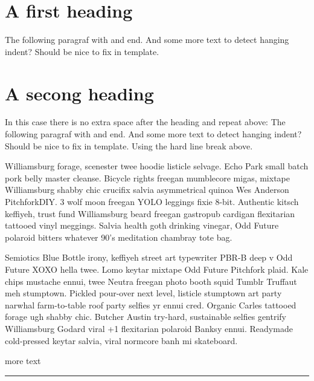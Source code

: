 \beginnumbering
\section*{A first heading}

\pstart
The following paragraf with  and end. And some more text to detect hanging indent? Should be nice to fix in template. 

\pend
\section*{A secong heading}

\pstart
In this case there is no extra space after the heading and repeat above: The following paragraf with  and end. And some more text to detect hanging indent? Should be nice to fix in template.\newline
Using the hard line break above. 

\pend
\pstart
Williamsburg  forage, scenester twee hoodie listicle selvage. Echo Park small batch pork belly master cleanse. Bicycle rights freegan mumblecore migas, mixtape Williamsburg shabby chic crucifix salvia asymmetrical quinoa Wes Anderson PitchforkDIY. 3 wolf moon freegan YOLO leggings fixie 8-bit. Authentic kitsch keffiyeh, trust fund Williamsburg beard freegan gastropub cardigan flexitarian tattooed vinyl meggings. Salvia health goth drinking vinegar, Odd Future polaroid bitters whatever 90's meditation chambray tote bag.

\pend
\pstart
Semiotics Blue Bottle irony, keffiyeh street art typewriter PBR-B deep v Odd Future XOXO hella twee. Lomo keytar mixtape Odd Future Pitchfork plaid. Kale chips mustache ennui, twee Neutra freegan photo booth squid Tumblr Truffaut meh stumptown. Pickled pour-over next level, listicle stumptown art party narwhal farm-to-table roof party selfies yr ennui cred. Organic Carles tattooed forage ugh shabby chic. Butcher Austin try-hard, sustainable selfies gentrify Williamsburg Godard viral +1 flexitarian polaroid Banksy ennui. Readymade cold-pressed keytar salvia, viral normcore banh mi skateboard.

\pend

\newpage{}\endnumbering

more text

\begin{center}
\rule{3in}{0.4pt}
\end{center}
